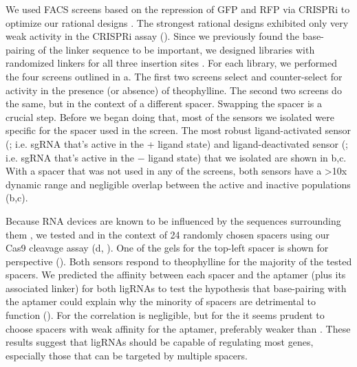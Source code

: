 \documentclass[10pt,oneside]{article}
\begin{document}

We used FACS screens based on the repression of GFP and RFP via CRISPRi to optimize our rational designs \invivo{}.  The strongest rational designs exhibited only very weak activity in the CRISPRi assay ().  Since we previously found the base-pairing of the linker sequence to be important, we designed libraries with randomized linkers for all three insertion sites .  For each library, we performed the four screens outlined in a.  The first two screens select and counter-select for activity in the presence (or absence) of theophylline.  The second two screens do the same, but in the context of a different spacer.  Swapping the spacer is a crucial step.  Before we began doing that, most of the sensors we isolated were specific for the spacer used in the screen.  The most robust ligand-activated sensor (\ligrnaF{}; i.e. sgRNA that's active in the + ligand state) and ligand-deactivated sensor (\ligrnaB{}; i.e. sgRNA that's active in the − ligand state) that we isolated are shown in b,c.  With a spacer that was not used in any of the screens, both sensors have a >10x dynamic range and negligible overlap between the active and inactive populations (b,c).


Because RNA devices are known to be influenced by the sequences surrounding them \autocite{liang2012}, we tested \ligrnaF{} and \ligrnaB{} in the context of 24 randomly chosen spacers using our \invitro{} Cas9 cleavage assay (d, ).  One of the gels for the top-left spacer is shown for perspective ().  Both sensors respond to theophylline for the majority of the tested spacers.  We predicted the affinity between each spacer and the aptamer (plus its associated linker) for both ligRNAs to test the hypothesis that base-pairing with the aptamer could explain why the minority of spacers are detrimental to function ().  For \ligrnaF{} the correlation is negligible, but for the \ligrnaB{} it seems prudent to choose spacers with weak affinity for the aptamer, preferably weaker than .  These results suggest that ligRNAs should be capable of regulating most genes, especially those that can be targeted by multiple spacers.
\end{document}
